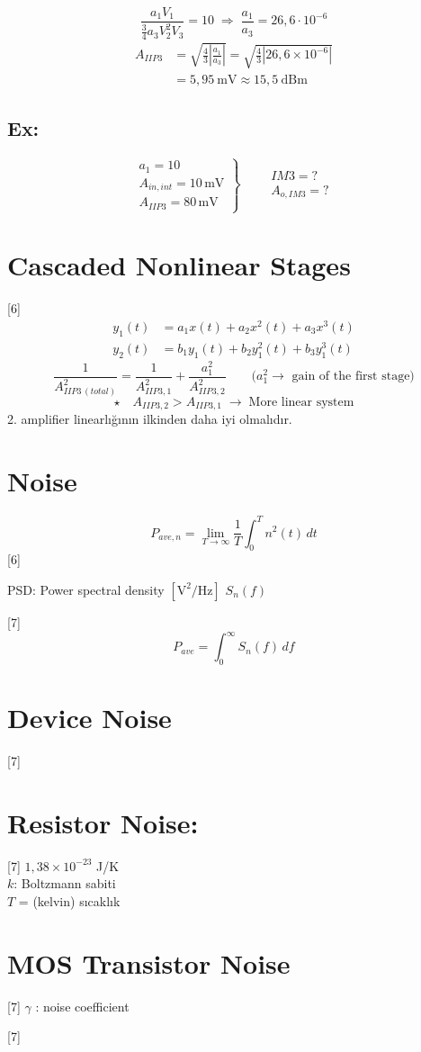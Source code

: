 \documentclass[11pt,a4paper]{article}
\begin{document}
\[ \frac{a_1V_1}{\frac34a_3V_2^2V_3} = 10 \;\Rightarrow\; \frac{a_1}{a_3} = 26{,}6\cdot10^{-6} \]
\begin{align*}
A_{IIP3} &= \sqrt{\frac43\left|\frac{a_1}{a_3}\right|} = \sqrt{\frac43\left|26{,}6\times10^{-6}\right|}\\
&= 5{,}95\ \mathrm{mV} \approx 15{,}5\ \mathrm{dBm}
\end{align*}

\subsection{Ex:}
\[ \left.\begin{array}{l} a_1 = 10\\ A_{in,int} = 10\,\mathrm{mV}\\ A_{IIP3} = 80\,\mathrm{mV}\end{array}\right\}\qquad \begin{array}{l} IM3 = ?\\ A_{o,IM3} = ?\end{array} \]

\section{Cascaded Nonlinear Stages}
[6]
\begin{align*}
y_1(t) &= a_1x(t)+a_2x^2(t)+a_3x^3(t)\\
y_2(t) &= b_1y_1(t)+b_2y_1^2(t)+b_3y_1^3(t)
\end{align*}
\[ \frac{1}{A_{IIP3\,(total)}^2} = \frac{1}{A_{IIP3,1}^2} + \frac{a_1^2}{A_{IIP3,2}^2} \qquad \text{($a_1^2 \to$ gain of the first stage)} \]
\[ \star\quad A_{IIP3,2} > A_{IIP3,1} \;\to\; \text{More linear system} \]
2. amplifier linearlığının ilkinden daha iyi olmalıdır.

\section{Noise}
\[ P_{ave,n} = \lim_{T\to\infty}\frac1T\int_0^T n^2(t)\,dt \]
[6]

PSD: Power spectral density $[\mathrm{V^2/Hz}]$ \quad $S_n(f)$

[7]
\[ P_{ave} = \int_0^\infty S_n(f)\,df \]

\section{Device Noise}
[7]

\section{Resistor Noise:}
[7]
$1{,}38\times10^{-23}$ J/K\\
$k$: Boltzmann sabiti\\
$T$ = (kelvin) sıcaklık

\section{MOS Transistor Noise}
[7]
$\gamma$ : noise coefficient

[7]
\end{document}
